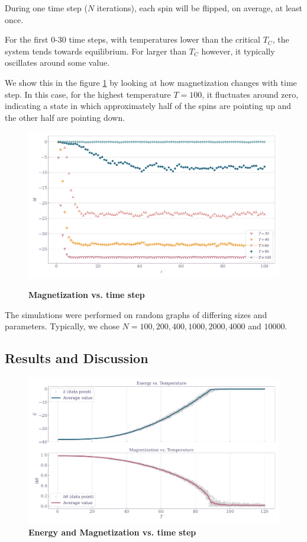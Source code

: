 \documentclass[11pt,a4paper]{article}
\begin{document}
During one time step ($N$ iterations), each spin will be flipped, on average, at least once.

For the first 0-30 time steps, with temperatures lower than the critical $T_C$, the system tends towards equilibrium. For larger than $T_C$ however, it typically oscillates around some value.

We show this in the figure \ref{fig:mag_vs_time} by looking at how magnetization changes with time step. In this case, for the highest temperature $T=100$, it fluctuates around zero, indicating a state in which approximately half of the spins are pointing up and the other half are pointing down.

\begin{figure}[ht!]
    \centering
    \caption{\textbf{Magnetization vs. time step}}
    \includegraphics[width=\linewidth]{../figures/magnet_vs_steps.pdf}
    \label{fig:mag_vs_time}
\end{figure}

The simulations were performed on random graphs of differing sizes and parameters. Typically, we chose $N=100,200,400,1000,2000,4000$ and $10000$.


\subsection{Results and Discussion}

\begin{figure}[ht!]
    \centering
    \caption{\textbf{Energy and Magnetization vs. time step}}
    \includegraphics[width=\linewidth]{../figures/energy_magnet_vs_temp.pdf}
\end{figure}
\end{document}
